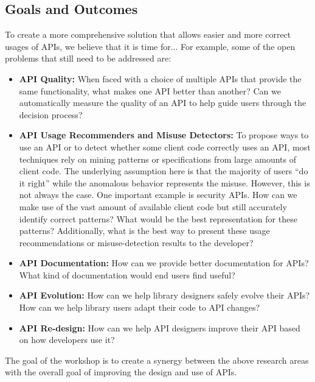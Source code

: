 \documentclass[10pt, conference]{IEEEtran}
\begin{document}
\subsection{Goals and Outcomes}
To create a more comprehensive solution that allows easier and more correct usages of APIs, we believe that it is time for... For example, some of the open problems that still need to be addressed are:

\begin{itemize}
\item \textbf{API Quality:} When faced with a choice of multiple APIs that provide the same functionality, what makes one API better than another? Can we automatically measure the quality of an API to help guide users through the decision process?

\item \textbf{API Usage Recommenders and Misuse Detectors:} To propose ways to use an API or to detect whether some client code correctly uses an API, most techniques rely on mining patterns or specifications from large amounts of client code. The underlying assumption here is that the majority of users ``do it right'' while the anomalous behavior represents the misuse. However, this is not always the case. One important example is security APIs. How can we make use of the vast amount of available client code but still accurately identify correct patterns? What would be the best representation for these patterns? Additionally, what is the best way to present these usage recommendations or misuse-detection results to the developer? 

\item\textbf{API Documentation:} How can we provide better documentation for APIs? What kind of documentation would end users find useful?

\item \textbf{API Evolution:} How can we help library designers safely evolve their APIs? How can we help library users adapt their code to API changes?

\item \textbf{API Re-design:} How can we help API designers improve their API based on how developers use it?
\end{itemize}

The goal of the workshop is to create a synergy between the above research areas with the overall goal of improving the design and use of APIs.
\end{document}
